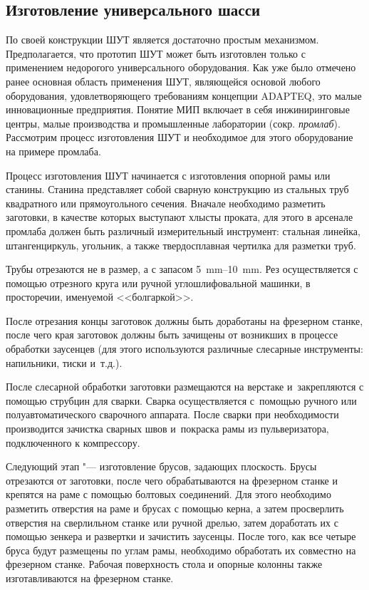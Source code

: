 \subsection{Изготовление универсального шасси}

По своей конструкции ШУТ является достаточно простым механизмом. Предполагается, что прототип ШУТ может быть изготовлен только с применением недорогого универсального оборудования. Как уже было отмечено ранее основная область применения ШУТ, являющейся основой любого оборудования, удовлетворяющего требованиям концепции ADAPTEQ, это малые инновационные предприятия. Понятие МИП включает в себя инжиниринговые центры, малые производства и промышленные лаборатории (сокр. \textit{промлаб}). Рассмотрим процесс изготовления ШУТ и необходимое для этого оборудование на примере промлаба.

Процесс изготовления ШУТ начинается с изготовления опорной рамы или станины. Станина представляет собой сварную конструкцию из стальных труб квадратного или прямоугольного сечения. Вначале необходимо разметить заготовки, в качестве которых выступают хлысты проката, для этого в арсенале промлаба должен быть различный измерительный инструмент: стальная линейка, штангенциркуль, угольник, а также твердосплавная чертилка для разметки труб.

Трубы отрезаются не в размер, а с запасом \SIrange{5}{10}{\milli\metre}. Рез осуществляется с помощью отрезного круга или ручной углошлифовальной машинки, в просторечии, именуемой <<болгаркой>>.

После отрезания концы заготовок должны быть доработаны на фрезерном станке, после чего края заготовок должны быть зачищены от возникших в процессе обработки заусенцев (для этого используются различные слесарные инструменты: напильники, тиски и~т.\:д.).

После слесарной обработки заготовки размещаются на верстаке и~закрепляются с помощью струбцин для сварки. Сварка осуществляется с~помощью ручного или полуавтоматического сварочного аппарата. После сварки при необходимости производится зачистка сварных швов и~покраска рамы из пульверизатора, подключенного к компрессору.

Следующий этап "--- изготовление брусов, задающих плоскость. Брусы отрезаются от заготовки, после чего обрабатываются на фрезерном станке и крепятся на раме с помощью болтовых соединений. Для этого необходимо разметить отверстия на раме и брусах с помощью керна, а затем просверлить отверстия на сверлильном станке или ручной дрелью, затем доработать их с помощью зенкера и развертки и зачистить заусенцы. После того, как все четыре бруса будут размещены по углам рамы, необходимо обработать их совместно на фрезерном станке. Рабочая поверхность стола и опорные колонны также изготавливаются на фрезерном станке.

